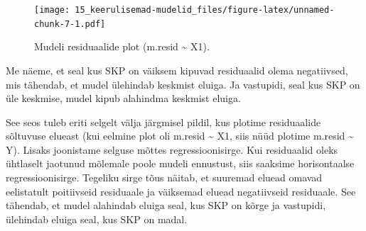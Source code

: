 \documentclass[]{book}
\newenvironment{Shaded}{\begin{snugshade}}{\end{snugshade}}
\newcommand{\KeywordTok}[1]{\textcolor[rgb]{0.13,0.29,0.53}{\textbf{#1}}}
\newcommand{\DataTypeTok}[1]{\textcolor[rgb]{0.13,0.29,0.53}{#1}}
\newcommand{\DecValTok}[1]{\textcolor[rgb]{0.00,0.00,0.81}{#1}}
\newcommand{\FloatTok}[1]{\textcolor[rgb]{0.00,0.00,0.81}{#1}}
\newcommand{\StringTok}[1]{\textcolor[rgb]{0.31,0.60,0.02}{#1}}
\newcommand{\CommentTok}[1]{\textcolor[rgb]{0.56,0.35,0.01}{\textit{#1}}}
\newcommand{\OperatorTok}[1]{\textcolor[rgb]{0.81,0.36,0.00}{\textbf{#1}}}
\newcommand{\NormalTok}[1]{#1}
\begin{document}
\begin{Shaded}
\end{Shaded}

\begin{figure}
\centering
\texttt{[image: 15\_keerulisemad-mudelid\_files/figure-latex/unnamed-chunk-7-1.pdf]}
\caption{\label{fig:unnamed-chunk-7}Mudeli residuaalide plot (m.resid
\textasciitilde{} X1).}
\end{figure}

Me näeme, et seal kus SKP on väiksem kipuvad residuaalid olema
negatiivsed, mis tähendab, et mudel ülehindab keskmist eluiga. Ja
vastupidi, seal kus SKP on üle keskmise, mudel kipub alahindma keskmist
eluiga.

See seos tuleb eriti selgelt välja järgmisel pildil, kus plotime
residuaalide sõltuvuse elueast (kui eelmine plot oli m.resid
\textasciitilde{} X1, siis nüüd plotime m.resid \textasciitilde{} Y).
Lisaks joonistame selguse mõttes regressioonisirge. Kui residuaalid
oleks ühtlaselt jaotunud mõlemale poole mudeli ennustust, siis saaksime
horisontaalse regressioonisirge. Tegeliku sirge tõus näitab, et suuremad
eluead omavad eelistatult poitiivseid residuaale ja väiksemad eluead
negatiivseid residuaale. See tähendab, et mudel alahindab eluiga seal,
kus SKP on kõrge ja vastupidi, ülehindab eluiga seal, kus SKP on madal.
\end{document}
